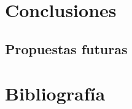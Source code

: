 \documentclass[12pt]{article}
\begin{document}
	
	\pagebreak
	
	\section{Conclusiones}
	
	\subsection{Propuestas futuras}
	

	\pagebreak
	\section{Bibliografía}
	
\end{document}
